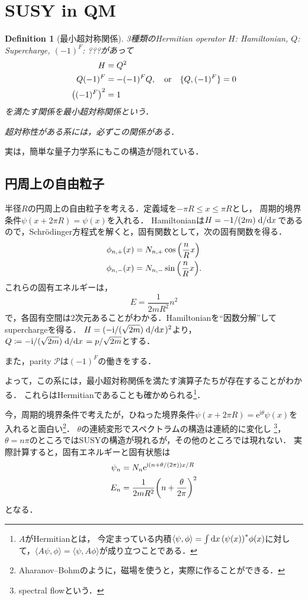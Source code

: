 \documentclass[english, dvipdfmx, a4paper]{jsarticle}
\title{}
\author{Toshiya Tanaka}
\date{\today}
\theoremstyle{break}
\newtheorem{defn}[thm]{Definition}
\renewcommand{\i}{\mathrm{i}}
\newcommand{\e}{\mathrm{e}}
\begin{document}
	\section{SUSY in QM}
	\begin{defn}[最小超対称関係]
		3種類のHermitian operator $H$: Hamiltonian, $Q$: Supercharge, $(-1)^F$: ???があって
		\begin{align}
			H &= Q^2\\
			Q(-1)^{F} &= -(-1)^{F}Q,\quad  \text{or}\quad \{Q, (-1)^F\} =0\\
			\qty((-1)^{F})^2 &=1
		\end{align}
		を満たす関係を最小超対称関係という．

		超対称性がある系には，必ずこの関係がある．
	\end{defn}
	実は，簡単な量子力学系にもこの構造が隠れている．
	\subsection{円周上の自由粒子}
	半径$R$の円周上の自由粒子を考える．定義域を$-\pi R\leq x\leq \pi R$とし，
	周期的境界条件$\psi(x+2\pi R) = \psi(x)$を入れる．
	Hamiltonianは$H=-1/(2m)\dv*{}{x}$であるので，Schr\"{o}dinger方程式を解くと，固有関数として，次の固有関数を得る．
	\begin{align}
		\phi_{n,+}(x) &= N_{n,+}\cos\qty(\frac{n}{R}x)\\
		\phi_{n,-}(x) &= N_{n, -} \sin\qty(\frac{n}{R}x).
	\end{align}
	これらの固有エネルギーは，
	\begin{equation}
		E=\frac{1}{2mR^2}n^2
	\end{equation}
	で，各固有空間は$2$次元あることがわかる．Hamiltonianを``因数分解''してsuperchargeを得る．
	$H = (-\i/(\sqrt{2m})\dv*{}{x})^2$より，$Q\coloneqq-\i/(\sqrt{2m})\dv*{}{x}=p/\sqrt{2m}$とする．

	また，parity $\mathcal{P}$は$(-1)^{F}$の働きをする．

	よって，この系には，最小超対称関係を満たす演算子たちが存在することがわかる．
	これらはHermitianであることも確かめられる\footnote{$A$がHermitianとは，
	今定まっている内積$\langle\psi, \phi\rangle=\int\dd{x}\qty(\psi(x))^*\phi(x)$に対して，$\langle A\psi, \phi\rangle = \langle \psi , A\phi\rangle$が成り立つことである．}．

	今，周期的境界条件で考えたが，ひねった境界条件$\psi(x+2\pi R) = \e^{\i\theta}\psi(x)$を入れると面白い\footnote{Aharanov--Bohmのように，磁場を使うと，実際に作ることができる．}．
	$\theta$の連続変形でスペクトラムの構造は連続的に変化し
	\footnote{spectral flowという．}，$\theta = n\pi$のところではSUSYの構造が現れるが，その他のところでは現れない．
	実際計算すると，固有エネルギーと固有状態は
	\begin{align}
		\psi_n &= N_{n}\e^{\i(n+\theta/(2\pi))x/R}\\
		E_n &= \frac{1}{2mR^2}\qty(n+\frac{\theta}{2\pi})^2
	\end{align}
	となる．
\end{document}
